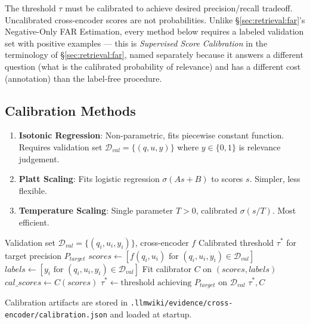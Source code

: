 The threshold $\tau$ must be calibrated to achieve desired precision/recall tradeoff. Uncalibrated cross-encoder scores are not probabilities. Unlike \S\ref{sec:retrieval:far}'s Negative-Only FAR Estimation, every method below requires a labeled validation set with positive examples --- this is \emph{Supervised Score Calibration} in the terminology of \S\ref{sec:retrieval:far}, named separately because it answers a different question (what is the calibrated probability of relevance) and has a different cost (annotation) than the label-free procedure.

\subsection{Calibration Methods}
\label{sec:retrieval:cal-methods}

\begin{enumerate}
  \item \textbf{Isotonic Regression}: Non-parametric, fits piecewise constant function. Requires validation set $\mathcal{D}_{val} = \{(q, u, y)\}$ where $y \in \{0,1\}$ is relevance judgement.
  \item \textbf{Platt Scaling}: Fits logistic regression $\sigma(As + B)$ to scores $s$. Simpler, less flexible.
  \item \textbf{Temperature Scaling}: Single parameter $T > 0$, calibrated $\sigma(s / T)$. Most efficient.
\end{enumerate}

\begin{algorithm}[H]
\caption{Calibration Procedure}
\label{alg:calibration}
\begin{algorithmic}[1]
\Require Validation set $\mathcal{D}_{val} = \{(q_i, u_i, y_i)\}$, cross-encoder $f$
\Ensure Calibrated threshold $\tau^*$ for target precision $P_{target}$
\State $scores \gets [f(q_i, u_i) \text{ for } (q_i, u_i, y_i) \in \mathcal{D}_{val}]$
\State $labels \gets [y_i \text{ for } (q_i, u_i, y_i) \in \mathcal{D}_{val}]$
\State Fit calibrator $C$ on $(scores, labels)$ 
\State $cal\_scores \gets C(scores)$
\State $\tau^* \gets \text{threshold achieving } P_{target} \text{ on } \mathcal{D}_{val}$
\State \Return $\tau^*, C$
\end{algorithmic}
\end{algorithm}

Calibration artifacts are stored in \texttt{.llmwiki/evidence/cross-encoder/calibration.json} and loaded at startup.

